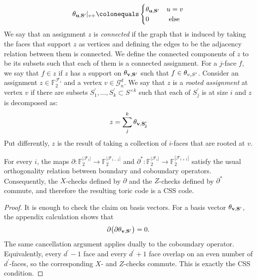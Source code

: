 \begin{definition}
  \begin{equation*}
    \begin{split}
      \rotfv{u}{S^{\prime}} |_{v+} \colonequals    
      \begin{cases}
      \rotfv{u}{S^{\prime}}  & u = v \\ 
        0 & \text{ else }
      \end{cases}
    \end{split}
  \end{equation*}
  We say that an assignment $z$ is \textit{connected} if the graph that is induced by taking the faces that support $z$ as vertices and defining the edges to be the adjacency relation between them is connected. We define the connected components of $z$ to be its subsets such that each of them is a connected assignment. For a $j$-face $f$, we say that $f \in z$ if $z$ has a support on $\mathbf{\theta_{v ,S^{\prime}}{} }{}$ such that $f \in \theta_{v ,S^{\prime}}{}$. Consider an assignment $z \in \mathbb{F}_{2}^{\mathcal{F}_{i}}$ and a vertex $v \in \mathcal{G}_{n}^{d}$. We say that $z$ is a \textit{rooted assignment} at vertex $v$ if there are subsets $S^{\prime}_{1}, \ldots, S^{\prime}_{k} \subset S^{\times k}$ such that each of $S^{\prime}_{j}$ is at size $i$ and $z$ is decomposed as:
  \begin{equation*}
    \begin{split}
    z = \sum_{j}^{k}\mathbf{\theta_{v ,S^{\prime}_{j}} }
    \end{split}
  \end{equation*}
  Put differently, $z$ is the result of taking a collection of $i$-faces that are rooted at $v$.
\end{definition}

\begin{claim}
  For every $i$, the maps $\partial \colon \mathbb{F}_{2}^{|\mathcal{F}_{i}|} \to \mathbb{F}_{2}^{|\mathcal{F}_{i-1}|}$ and $\partial^{*} \colon \mathbb{F}_{2}^{|\mathcal{F}_{i}|} \to \mathbb{F}_{2}^{|\mathcal{F}_{i+1}|}$ satisfy the usual orthogonality relation between boundary and coboundary operators. Consequently, the $X$-checks defined by $\partial$ and the $Z$-checks defined by $\partial^{*}$ commute, and therefore the resulting toric code is a CSS code.
\end{claim}
\begin{proof}
  It is enough to check the claim on basis vectors. For a basis vector $\mathbf{\theta_{v ,S^{\prime}}{} }{}$, the appendix calculation shows that
  \begin{equation*}
    \begin{split}
      \partial\bigl(\partial \mathbf{\theta_{v ,S^{\prime}}{} }{}\bigr)=0.
    \end{split}
  \end{equation*}
  The same cancellation argument applies dually to the coboundary operator. Equivalently, every $d^{\prime}-1$ face and every $d^{\prime}+1$ face overlap on an even number of $d^{\prime}$-faces, so the corresponding $X$- and $Z$-checks commute. This is exactly the CSS condition.
\end{proof}

